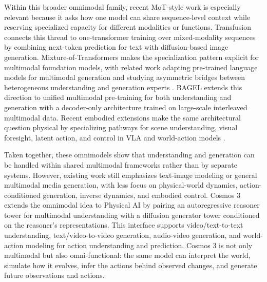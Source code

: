 Within this broader omnimodal family, recent MoT-style work is especially relevant because it asks how one model can share sequence-level context while reserving specialized capacity for different modalities or functions.
Transfusion \citep{zhou2024transfusion} connects this thread to one-transformer training over mixed-modality sequences by combining next-token prediction for text with diffusion-based image generation.
Mixture-of-Transformers \citep{liang2024mot} makes the specialization pattern explicit for multimodal foundation models, with related work adapting pre-trained language models for multimodal generation and studying asymmetric bridges between heterogeneous understanding and generation experts \citep{shi2025lmfusion,wang2025hbridge}.
BAGEL \citep{deng2025bagel} extends this direction to unified multimodal pre-training for both understanding and generation with a decoder-only architecture trained on large-scale interleaved multimodal data.
Recent embodied extensions make the same architectural question physical by specializing pathways for scene understanding, visual foresight, latent action, and control in VLA and world-action models \citep{lv2025f1,cai2026internvlaa1,shou2026halo,bi2025motus,motubrain2026,li2026causalworld,tencent2026hyembodied}.

Taken together, these omnimodels show that understanding and generation can be handled within shared multimodal frameworks rather than by separate systems.
However, existing work still emphasizes text-image modeling or general multimodal media generation, with less focus on physical-world dynamics, action-conditioned generation, inverse dynamics, and embodied control.
Cosmos 3 extends the omnimodal idea to Physical AI by pairing an autoregressive reasoner tower for multimodal understanding with a diffusion generator tower conditioned on the reasoner's representations.
This interface supports video/text-to-text understanding, text/video-to-video generation, audio-video generation, and world-action modeling for action understanding and prediction.
Cosmos 3 is not only multimodal but also omni-functional: the same model can interpret the world, simulate how it evolves, infer the actions behind observed changes, and generate future observations and actions.
